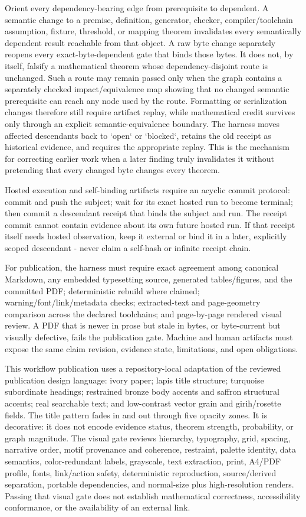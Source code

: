 \documentclass[11pt]{article}
\begin{document}
\begin{markdown}
Orient every dependency-bearing edge from prerequisite to dependent. A semantic change to a
premise, definition, generator, checker, compiler/toolchain assumption, fixture, threshold, or
mapping theorem invalidates every semantically dependent result reachable from that object. A raw
byte change separately reopens every exact-byte-dependent gate that binds those bytes. It does not,
by itself, falsify a mathematical theorem whose dependency-disjoint route is unchanged. Such a
route may remain passed only when the graph contains a separately checked impact/equivalence map
showing that no changed semantic prerequisite can reach any node used by the route. Formatting or
serialization changes therefore still require artifact replay, while mathematical credit survives
only through an explicit semantic-equivalence boundary. The harness moves affected descendants
back to `open` or `blocked`, retains the old receipt as historical evidence, and requires the
appropriate replay. This is the mechanism for correcting earlier work when a later finding truly
invalidates it without pretending that every changed byte changes every theorem.

Hosted execution and self-binding artifacts require an acyclic commit protocol: commit and push the
subject; wait for its exact hosted run to become terminal; then commit a descendant receipt that
binds the subject and run. The receipt commit cannot contain evidence about its own future hosted
run. If that receipt itself needs hosted observation, keep it external or bind it in a later,
explicitly scoped descendant - never claim a self-hash or infinite receipt chain.

For publication, the harness must require exact agreement among canonical Markdown, any embedded
typesetting source, generated tables/figures, and the committed PDF; deterministic rebuild where
claimed; warning/font/link/metadata checks; extracted-text and page-geometry comparison across the
declared toolchains; and page-by-page rendered visual review. A PDF that is newer in prose but stale
in bytes, or byte-current but visually defective, fails the publication gate. Machine and human
artifacts must expose the same claim revision, evidence state, limitations, and open obligations.

This workflow publication uses a repository-local adaptation of the reviewed publication design
language: ivory paper; lapis title structure; turquoise subordinate headings; restrained bronze
body accents and saffron structural accents; real searchable text; and low-contrast vector grain and
girih/rosette fields. The title pattern fades in and out through five opacity zones. It is
decorative: it does not encode evidence status, theorem strength, probability, or graph magnitude.
The visual gate reviews hierarchy, typography, grid, spacing, narrative order, motif provenance and
coherence, restraint, palette identity, data semantics, color-redundant labels, grayscale, text
extraction, print, A4/PDF profile, fonts, link/action safety, deterministic reproduction,
source/derived separation, portable dependencies, and normal-size plus high-resolution renders.
Passing that visual gate does not establish mathematical correctness, accessibility conformance,
or the availability of an external link.


\end{markdown}
\end{document}
